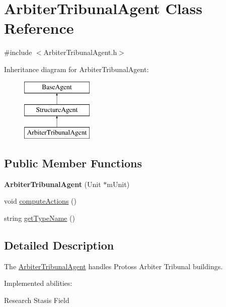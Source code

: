 \hypertarget{class_arbiter_tribunal_agent}{
\section{ArbiterTribunalAgent Class Reference}
\label{class_arbiter_tribunal_agent}
}


{\ttfamily \#include $<$ArbiterTribunalAgent.h$>$}

Inheritance diagram for ArbiterTribunalAgent:\begin{figure}[H]
\begin{center}
\leavevmode
\includegraphics[height=3.000000cm]{class_arbiter_tribunal_agent}
\end{center}
\end{figure}
\subsection*{Public Member Functions}
\begin{DoxyCompactItemize}
\item 
\hypertarget{class_arbiter_tribunal_agent_a6fc2a2ebbef70cfd05d7e036cc94a0cd}{
{\bfseries ArbiterTribunalAgent} (Unit $\ast$mUnit)}
\label{class_arbiter_tribunal_agent_a6fc2a2ebbef70cfd05d7e036cc94a0cd}

\item 
void \hyperlink{class_arbiter_tribunal_agent_a426cf40129ce688db3a5c3c39dc163be}{computeActions} ()
\item 
string \hyperlink{class_arbiter_tribunal_agent_ae93eba654725699e8b182b2bb5b91b1c}{getTypeName} ()
\end{DoxyCompactItemize}


\subsection{Detailed Description}
The \hyperlink{class_arbiter_tribunal_agent}{ArbiterTribunalAgent} handles Protoss Arbiter Tribunal buildings.

Implemented abilities:
\begin{DoxyItemize}
\item Research Stasis Field
\end{DoxyItemize}

